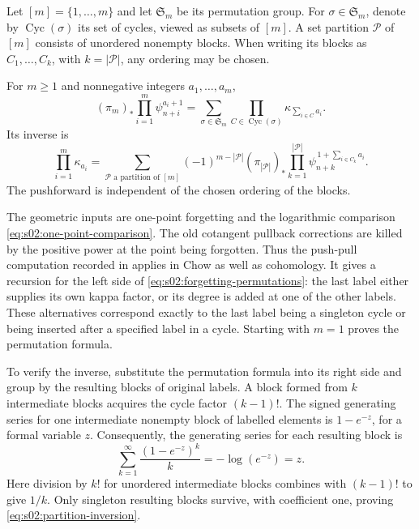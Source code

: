 Let $[m]=\{1,\ldots,m\}$ and let $\mathfrak S_m$ be its permutation
group.  For $\sigma\in\mathfrak S_m$, denote by
$\operatorname{Cyc}(\sigma)$ its set of cycles, viewed as subsets of
$[m]$.  A set partition $\mathcal P$ of $[m]$ consists of unordered
nonempty blocks.  When writing its blocks as $C_1,\ldots,C_k$, with
$k=|\mathcal P|$, any ordering may be chosen.

\begin{lmm}
\label{lmm:s02:forgetting-inversion}
For $m\geq1$ and nonnegative integers $a_1,\ldots,a_m$,
\begin{equation}
\label{eq:s02:forgetting-permutations}
(\pi_m)_*\prod_{i=1}^m\psi_{n+i}^{a_i+1}
=\sum_{\sigma\in\mathfrak S_m}
\prod_{C\in\operatorname{Cyc}(\sigma)}\kappa_{\sum_{i\in C}a_i}.
\end{equation}
Its inverse is
\begin{equation}
\label{eq:s02:partition-inversion}
\prod_{i=1}^m\kappa_{a_i}
=\sum_{\mathcal P\text{ a partition of }[m]}
(-1)^{m-|\mathcal P|}(\pi_{|\mathcal P|})_*
\prod_{k=1}^{|\mathcal P|}
\psi_{n+k}^{\,1+\sum_{i\in C_k}a_i}.
\end{equation}
The pushforward is independent of the chosen ordering of the blocks.
\end{lmm}

\begin{prf}
The geometric inputs are one-point forgetting and the logarithmic
comparison \eqref{eq:s02:one-point-comparison}.  The old cotangent
pullback corrections are killed by the positive power at the point
being forgotten.  Thus the push-pull computation recorded in
\cite[(2.9)--(2.11)]{KMZ96v1} applies in Chow as well as cohomology.
It gives a recursion for the left side of
\eqref{eq:s02:forgetting-permutations}: the last label either supplies
its own kappa factor, or its degree is added at one of the other
labels.  These alternatives correspond exactly to the last label
being a singleton cycle or being inserted after a specified label in
a cycle.  Starting with $m=1$ proves the permutation formula.

To verify the inverse, substitute the permutation formula into its
right side and group by the resulting blocks of original labels.  A
block formed from $k$ intermediate blocks acquires the cycle factor
$(k-1)!$.  The signed generating series for one intermediate nonempty
block of labelled elements is $1-e^{-z}$, for a formal variable $z$.
Consequently, the generating series for each resulting block is
\[
\sum_{k=1}^{\infty}\frac{(1-e^{-z})^k}{k}
=-\log(e^{-z})=z.
\]
Here division by $k!$ for unordered intermediate blocks combines with
$(k-1)!$ to give $1/k$.  Only singleton resulting blocks survive,
with coefficient one, proving \eqref{eq:s02:partition-inversion}.
\end{prf}

